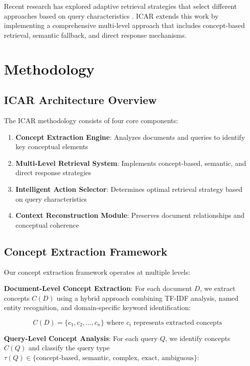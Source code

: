 \documentclass[11pt]{article}
\begin{document}
Recent research has explored adaptive retrieval strategies that select different approaches based on query characteristics \cite{chen2022}. ICAR extends this work by implementing a comprehensive multi-level approach that includes concept-based retrieval, semantic fallback, and direct response mechanisms.

\section{Methodology}

\subsection{ICAR Architecture Overview}

The ICAR methodology consists of four core components:

\begin{enumerate}
\item \textbf{Concept Extraction Engine}: Analyzes documents and queries to identify key conceptual elements
\item \textbf{Multi-Level Retrieval System}: Implements concept-based, semantic, and direct response strategies
\item \textbf{Intelligent Action Selector}: Determines optimal retrieval strategy based on query characteristics
\item \textbf{Context Reconstruction Module}: Preserves document relationships and conceptual coherence
\end{enumerate}

\subsection{Concept Extraction Framework}

Our concept extraction framework operates at multiple levels:

\textbf{Document-Level Concept Extraction}: For each document $D$, we extract concepts $C(D)$ using a hybrid approach combining TF-IDF analysis, named entity recognition, and domain-specific keyword identification:

\begin{equation}
C(D) = \{c_1, c_2, \ldots, c_n\} \text{ where } c_i \text{ represents extracted concepts}
\end{equation}

\textbf{Query-Level Concept Analysis}: For each query $Q$, we identify concepts $C(Q)$ and classify the query type $\tau(Q) \in \{\text{concept-based, semantic, complex, exact, ambiguous}\}$:
\end{document}
